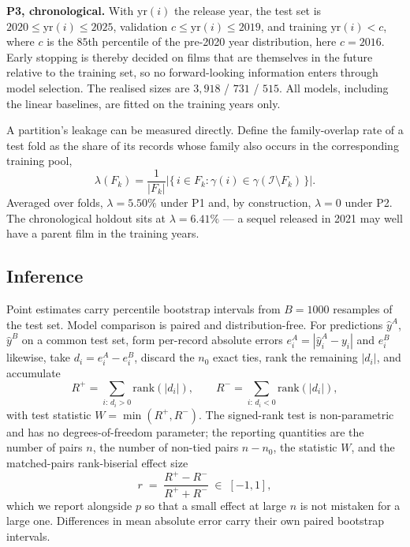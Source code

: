 \documentclass[conference,a4paper]{IEEEtran}
\newcommand{\hlt}[1]{\textbf{#1}}
\begin{document}
\hlt{P3, chronological.} With $\mathrm{yr}(i)$ the release year, the
test set is $2020 \le \mathrm{yr}(i) \le 2025$, validation
$c \le \mathrm{yr}(i) \le 2019$, and training $\mathrm{yr}(i) < c$, where
$c$ is the $85$th percentile of the pre-2020 year distribution,
here $c = 2016$. Early stopping is thereby decided on films that are
themselves in the future relative to the training set, so no
forward-looking information enters through model selection. The realised
sizes are $3{,}918$ / $731$ / $515$. All models, including the linear
baselines, are fitted on the training years only.

A partition's leakage can be measured directly. Define the family-overlap
rate of a test fold as the share of its records whose family also occurs
in the corresponding training pool,
\begin{equation}
\lambda(F_k) = \frac{1}{|F_k|}
\bigl|\{\, i \in F_k : \gamma(i) \in \gamma(\mathcal{I} \setminus F_k) \,\}\bigr| .
\end{equation}
Averaged over folds, $\lambda = 5.50\%$ under P1 and, by construction,
$\lambda = 0$ under P2. The chronological holdout sits at
$\lambda = 6.41\%$ --- a sequel released in 2021 may well have a parent
film in the training years.

\subsection{Inference}

Point estimates carry percentile bootstrap intervals from $B = 1000$
resamples of the test set. Model comparison is paired and
distribution-free. For predictions $\hat{y}^{A}$, $\hat{y}^{B}$ on a
common test set, form per-record absolute errors
$e^{A}_i = |\hat{y}^{A}_i - y_i|$ and $e^{B}_i$ likewise, take
$d_i = e^{A}_i - e^{B}_i$, discard the $n_0$ exact ties, rank the
remaining $|d_i|$, and accumulate
\begin{equation}
R^{+} = \!\!\sum_{i:\, d_i > 0}\!\! \mathrm{rank}(|d_i|),
\qquad
R^{-} = \!\!\sum_{i:\, d_i < 0}\!\! \mathrm{rank}(|d_i|) ,
\end{equation}
with test statistic $W = \min(R^{+}, R^{-})$. The signed-rank test is
non-parametric and has no degrees-of-freedom parameter; the reporting
quantities are the number of pairs $n$, the number of non-tied pairs
$n - n_0$, the statistic $W$, and the matched-pairs rank-biserial effect
size
\begin{equation}
r \;=\; \frac{R^{+} - R^{-}}{R^{+} + R^{-}} \;\in\; [-1, 1] ,
\end{equation}
which we report alongside $p$ so that a small effect at large $n$ is not
mistaken for a large one. Differences in mean absolute error carry their
own paired bootstrap intervals.
\end{document}
